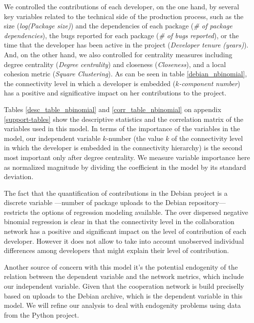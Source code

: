 We controlled the contributions of each developer, on the one hand, by several key variables related to the technical side of the production process, such as the size (\emph{log(Package size)}) and the dependencies of each package (\emph{\# of package dependencies}), the bugs reported for each package (\emph{\# of bugs reported}), or the time that the developer has been active in the project (\emph{Developer tenure (years)}). And, on the other hand, we also controlled for centrality measures including degree centrality (\emph{Degree centrality}) and closeness (\emph{Closeness}), and a local cohesion metric (\emph{Square Clustering}). As can be seen in table \ref{debian_nbinomial}, the connectivity level in which a developer is embedded (\emph{$k$-component number}) has a positive and significative impact on her contributions to the project.



Tables \ref{desc_table_nbinomial} and \ref{corr_table_nbinomial} on appendix \ref{support-tables} show the descriptive statistics and the correlation matrix of the variables used in this model. In terms of the importance of the variables in the model, our independent variable $k$-number (the value $k$ of the connectivity level in which the developer is embedded in the connectivity hierarchy) is the second most important only after degree centrality. We measure variable importance here as normalized magnitude by dividing the coefficient in the model by its standard deviation.
 
The fact that the quantification of contributions in the Debian project is a discrete variable ---number of package uploads to the Debian repository--- restricts the options of regression modeling available. The over dispersed negative binomial regression is clear in that the connectivity level in the collaboration network has a positive and significant impact on the level of contribution of each developer. However it does not allow to take into account unobserved individual differences among developers that might explain their level of contribution.

Another source of concern with this model it's the potential endogenity of the relation between the dependent variable and the network metrics, which include our independent variable. Given that the cooperation network is build preciselly based on uploads to the Debian archive, which is the dependent variable in this model. We will refine our analysis to deal with endogenity problems using data from the Python project. 

